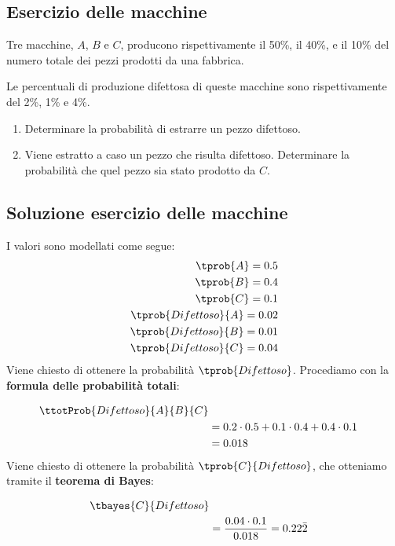 \documentclass[\main/main.tex]{subfiles}
\begin{document}
\subsection{Esercizio delle macchine}
Tre macchine, $A$, $B$ e $C$, producono rispettivamente il 50\%, il 40\%, e il 10\% del numero totale dei pezzi prodotti da una fabbrica.

Le percentuali di produzione difettosa di queste macchine sono rispettivamente del 2\%, 1\% e 4\%.

\begin{enumerate}
  \item Determinare la probabilità di estrarre un pezzo difettoso.
  \item Viene estratto a caso un pezzo che risulta difettoso. Determinare la probabilità che quel pezzo sia stato prodotto da $C$.
\end{enumerate}

\subsection{Soluzione esercizio delle macchine}
I valori sono modellati come segue:
\begin{align*}
  \tprob{A} = 0.5             \\
  \tprob{B} = 0.4             \\
  \tprob{C} = 0.1             \\
  \tprob{Difettoso}{A} = 0.02 \\
  \tprob{Difettoso}{B} = 0.01 \\
  \tprob{Difettoso}{C} = 0.04 \\
\end{align*}
Viene chiesto di ottenere la probabilità $\tprob{Difettoso}$. Procediamo con la \textbf{formula delle probabilità totali}:

\formulaProbTot

\begin{align*}
  \ttotProb{Difettoso}{A}{B}{C}                \\
   & = 0.2\cdot0.5 + 0.1\cdot0.4 + 0.4\cdot0.1 \\
   & =0.018
\end{align*}
Viene chiesto di ottenere la probabilità $\tprob{C}{Difettoso}$, che otteniamo tramite il \textbf{teorema di Bayes}:

\bayesTh

\begin{align*}
  \tbayes{C}{Difettoso}            \\
   & = \frac{0.04\cdot 0.1}{0.018}
  = 0.22\bar{2}
\end{align*}
\end{document}
